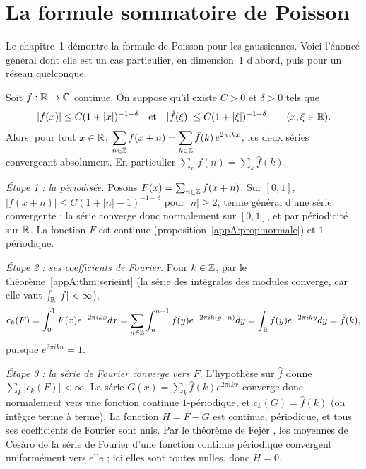 \section{La formule sommatoire de Poisson}\label{appA:sec:poisson}

Le chapitre~1 démontre la formule de Poisson pour les gaussiennes. Voici l'énoncé général dont elle est un cas
particulier, en dimension~$1$ d'abord, puis pour un réseau quelconque.

\begin{theorem}\label{appA:thm:poisson1}
Soit $f:\mathbb{R}\to\mathbb{C}$ continue. On suppose qu'il existe $C>0$ et $\delta>0$ tels que
\[|f(x)|\le C(1+|x|)^{-1-\delta}\quad\text{et}\quad|\hat f(\xi)|\le C(1+|\xi|)^{-1-\delta}\qquad(x,\xi\in\mathbb{R}).\]
Alors, pour tout $x\in\mathbb{R}$, $\displaystyle\sum_{n\in\mathbb{Z}}f(x+n)=\sum_{k\in\mathbb{Z}}\hat f(k)\,e^{2\pi ikx}$, les deux séries
convergeant absolument. En particulier $\sum_nf(n)=\sum_k\hat f(k)$.
\end{theorem}

\begin{humanproof}
\emph{Étape 1 : la périodisée.} Posons $F(x)=\sum_{n\in\mathbb{Z}}f(x+n)$. Sur $[0,1]$, $|f(x+n)|\le C(1+|n|-1)^{-1-\delta}$
pour $|n|\ge2$, terme général d'une série convergente ; la série converge donc normalement sur $[0,1]$, et par
périodicité sur $\mathbb{R}$. La fonction $F$ est continue (proposition~\ref{appA:prop:normale}) et $1$-périodique.

\emph{Étape 2 : ses coefficients de Fourier.} Pour $k\in\mathbb{Z}$, par le théorème~\ref{appA:thm:serieint} (la série des
intégrales des modules converge, car elle vaut $\int_{\mathbb{R}}|f|<\infty$),
\[c_k(F)=\int_0^1F(x)e^{-2\pi ikx}dx=\sum_{n\in\mathbb{Z}}\int_n^{n+1}f(y)e^{-2\pi ik(y-n)}dy=\int_{\mathbb{R}} f(y)e^{-2\pi iky}dy=\hat
f(k),\]
puisque $e^{2\pi ikn}=1$.

\emph{Étape 3 : la série de Fourier converge vers $F$.} L'hypothèse sur $\hat f$ donne $\sum_k|c_k(F)|<\infty$. La série
$G(x)=\sum_k\hat f(k)e^{2\pi ikx}$ converge donc normalement vers une fonction continue $1$-périodique, et
$c_k(G)=\hat f(k)$ (on intègre terme à terme). La fonction $H=F-G$ est continue, périodique, et tous ses coefficients
de Fourier sont nuls. Par le théorème de Fejér \tierL, les moyennes de Cesàro de la série de Fourier d'une fonction
continue périodique convergent uniformément vers elle ; ici elles sont toutes nulles, donc $H=0$.
\end{humanproof}


